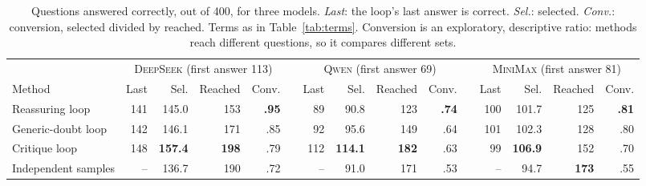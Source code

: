 \documentclass[11pt]{article}
\newcommand{\ds}{\textsc{DeepSeek}}
\newcommand{\qw}{\textsc{Qwen}}
\newcommand{\mm}{\textsc{MiniMax}}
\begin{document}
\begin{table}[t]
\centering
\small
\setlength{\tabcolsep}{3.4pt}
\begin{tabular}{@{}l rrrr c rrrr c rrrr@{}}
\toprule
 & \multicolumn{4}{c}{\ds{} (first answer 113)} & & \multicolumn{4}{c}{\qw{} (first answer 69)} & & \multicolumn{4}{c}{\mm{} (first answer 81)} \\
\cmidrule(lr){2-5}\cmidrule(lr){7-10}\cmidrule(l){12-15}
Method & Last & Sel. & Reached & Conv. & & Last & Sel. & Reached & Conv. & & Last & Sel. & Reached & Conv. \\
\midrule
Reassuring loop & 141 & 145.0 & 153 & \textbf{.95} & & 89 & 90.8 & 123 & \textbf{.74} & & 100 & 101.7 & 125 & \textbf{.81} \\
Generic-doubt loop & 142 & 146.1 & 171 & .85 & & 92 & 95.6 & 149 & .64 & & 101 & 102.3 & 128 & .80 \\
Critique loop & 148 & \textbf{157.4} & \textbf{198} & .79 & & 112 & \textbf{114.1} & \textbf{182} & .63 & & 99 & \textbf{106.9} & 152 & .70 \\
Independent samples & -- & 136.7 & 190 & .72 & & -- & 91.0 & 171 & .53 & & -- & 94.7 & \textbf{173} & .55 \\
\bottomrule
\end{tabular}
\caption{Questions answered correctly, out of 400, for three models. \emph{Last}: the loop's last answer is correct. \emph{Sel.}: selected. \emph{Conv.}: conversion, selected divided by reached. Terms as in Table~\ref{tab:terms}. Conversion is an exploratory, descriptive ratio: methods reach different questions, so it compares different sets.}
\label{tab:main}
\end{table}
\end{document}
